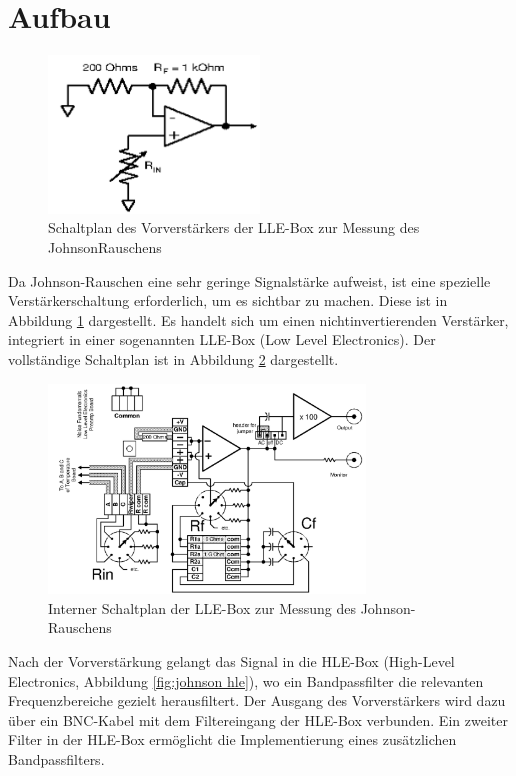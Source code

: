 \documentclass{article}
\begin{document}
\section{Aufbau}
\FloatBarrier
\begin{figure}[htbp]
    \centering
    \includegraphics[width=0.5\textwidth]{figs/schalt amplifier.png}
    \caption{Schaltplan des Vorverstärkers der LLE-Box zur Messung des JohnsonRauschens \cite{praktikum}}
    \label{fig:schaltamplifier}
\end{figure}
\FloatBarrier
Da Johnson-Rauschen eine sehr geringe Signalstärke aufweist, ist eine spezielle Verstärkerschaltung erforderlich, um es sichtbar zu machen. Diese ist in Abbildung \ref{fig:schaltamplifier} dargestellt. Es handelt sich um einen nichtinvertierenden Verstärker, integriert in einer sogenannten LLE-Box (Low Level Electronics). Der vollständige Schaltplan ist in Abbildung \ref{fig:johnson lle} dargestellt.
\FloatBarrier
\begin{figure}[htbp]
    \centering
    \includegraphics[width=0.75\textwidth]{figs/johnson lle.png}
    \caption{Interner Schaltplan der LLE-Box zur Messung des Johnson-Rauschens \cite{praktikum}}
    \label{fig:johnson lle}
\end{figure}
\FloatBarrier
Nach der Vorverstärkung gelangt das Signal in die HLE-Box (High-Level Electronics, Abbildung \ref{fig:johnson hle}), wo ein Bandpassfilter die relevanten Frequenzbereiche gezielt herausfiltert. Der Ausgang des Vorverstärkers wird dazu über ein BNC-Kabel mit dem Filtereingang der HLE-Box verbunden. Ein zweiter Filter in der HLE-Box ermöglicht die Implementierung eines zusätzlichen Bandpassfilters.
\end{document}
